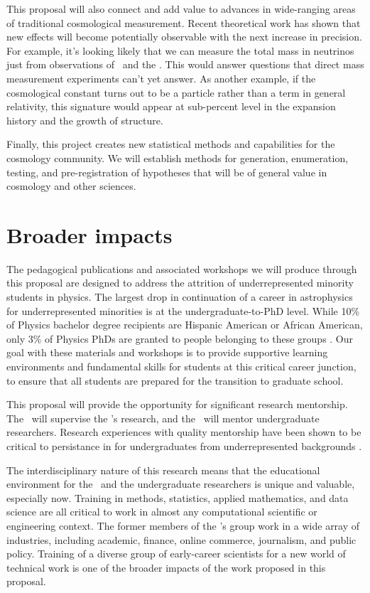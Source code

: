 \documentclass[12pt, fullpage, letterpaper]{article}
\begin{document}
This proposal will also connect and add value to advances in wide-ranging areas of traditional cosmological measurement.
Recent theoretical work has shown that new effects will become potentially observable with the next increase in precision.
For example, it's looking likely that we can measure the total mass in
neutrinos just from observations of \LSS\ and the
\CMB.
This would answer questions that direct mass measurement experiments 
can't yet answer.
As another example, if the cosmological constant turns out to be a particle rather
than a term in general relativity,
this signature would appear at sub-percent level in the
expansion history and the growth of structure.

Finally, this project creates new statistical methods and capabilities for the 
cosmology community.
We will establish methods for generation, enumeration, testing, and pre-registration of hypotheses that
will be of general value in cosmology and other
sciences.

\section{Broader impacts}

The pedagogical publications and associated workshops we will produce through this proposal are designed to address the attrition of underrepresented minority students in physics.
The largest drop in continuation of a career in astrophysics for underrepresented minorities is at the undergraduate-to-PhD level.
While 10\% of Physics bachelor degree recipients are Hispanic American or African American, only 3\% of Physics PhDs are granted to people belonging to these groups \citep{Ivie2018}.
Our goal with these materials and workshops is to provide supportive learning environments and fundamental skills for students at this critical career junction, to ensure that all students are prepared for the transition to graduate school.

This proposal will provide the opportunity for significant research mentorship.
The \PI\ will supervise the \GRA's research, and the \GRA\ will mentor undergraduate researchers.
Research experiences with quality mentorship have been shown to be critical to persistance in  for undergraduates from underrepresented backgrounds \citep{Estrada2018}.

The interdisciplinary nature of this research means that the educational environment for the \GRA\ and the undergraduate researchers is unique and valuable, especially now.
Training in methods, statistics, applied mathematics, and data science are all critical to work in almost any computational scientific or engineering context.
The former members of the \PI's group work in a wide array of industries, including academic, finance, online commerce, journalism, and public policy.
Training of a diverse group of early-career scientists for a new world of technical work is one of the broader impacts of the work proposed in this proposal.
\end{document}
